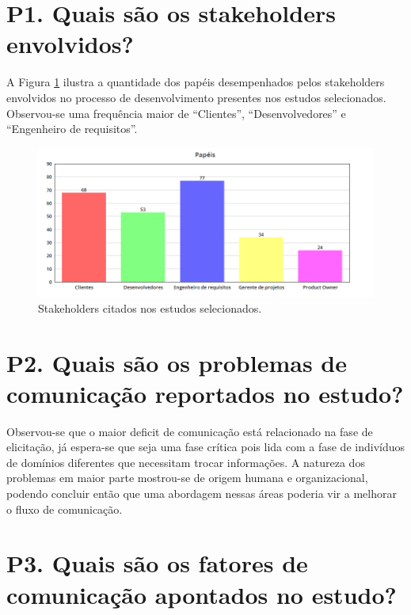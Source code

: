 \section{P1. Quais são os stakeholders envolvidos?}

A Figura \ref{fig:grafpap} ilustra a quantidade dos papéis desempenhados pelos stakeholders envolvidos no processo de desenvolvimento presentes nos estudos selecionados. Observou-se uma frequência maior de ``Clientes'', ``Desenvolvedores'' e ``Engenheiro de requisitos''. %

\begin{figure}[h!] %
	\caption{Stakeholders citados nos estudos selecionados.}
	\begin{center}
	    \includegraphics[scale=0.4]{figuras/grafpap.png} %
	\end{center}
	\label{fig:grafpap}
\end{figure}

\section{P2. Quais são os problemas de comunicação reportados no estudo?}

Observou-se que o maior deficit de comunicação está relacionado na fase de elicitação, já espera-se que seja uma fase crítica pois lida com a fase de indivíduos de domínios diferentes que necessitam trocar informações.
A natureza dos problemas em maior parte mostrou-se de origem humana e organizacional, podendo concluir então que uma abordagem nessas áreas poderia vir a melhorar o fluxo de comunicação.

\section{P3. Quais são os fatores de comunicação apontados no estudo?}

